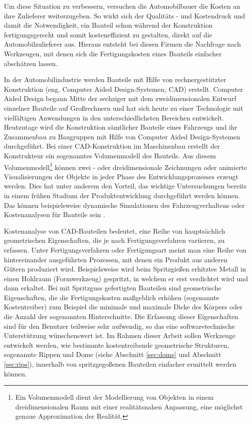 Um diese Situation zu verbessern, versuchen die Automobilbauer die Kosten an ihre Zulieferer weiterzugeben. So wirkt sich der Qualit\"ats - und Kostendruck und damit die Notwendigkeit, ein Bauteil schon w\"ahrend der Konstruktion fertigungsgerecht und somit kosteneffizient zu gestalten, direkt auf die Automobilzulieferer aus. Hieraus entsteht bei diesen Firmen die Nachfrage nach Werkzeugen, mit denen sich die Fertigungskosten eines Bauteils einfacher absch\"atzen lassen. 

In der Automobilindustrie werden Bauteile mit Hilfe von rechnergest\"utzter Konstruktion (eng. Computer Aided Design-Systemen, CAD) erstellt. Computer Aided Design begann Mitte der sechziger mit dem zweidimensionalen Entwurf einzelner Bauteile auf Gro{\ss}rechnern und hat sich heute zu einer Technologie mit vielf\"altigen Anwendungen in den unterschiedlichsten Bereichen entwickelt. Heutzutage wird die Konstruktion s\"amtlicher Bauteile eines Fahrzeugs und ihr Zusammenbau zu Baugruppen mit Hilfe 
von Computer Aided Design-Systemen durchgef\"uhrt. Bei einer CAD-Konstruktion im Maschinenbau erstellt der Konstrukteur ein sogenanntes Volumenmodell des Bauteils. Aus diesem Volumenmodell\footnote{Ein Volumenmodell dient der Modellierung von Objekten in einem dreidimensionalen Raum mit einer realit\"atsnahen Anpassung, eine m\"oglichst genaue Approximation der Realit\"at.} k\"onnen zwei - oder  dreidimensionale Zeichnungen oder animierte Visualisierungen der Objekte in jeder Phase des Entwicklungsprozesses erzeugt werden. Dies hat unter anderem den Vorteil, das wichtige Untersuchungen bereits in einem fr\"uhen Stadium der Produktentwicklung durchgef\"uhrt werden k\"onnen. Das k\"onnen beispielsweise dynamische Simulationen des Fahrzeugverhaltens oder Kostenanalysen f\"ur Bauteile sein \cite{koenig}.

Kostenanalyse von CAD-Bauteilen bedeutet, eine Reihe von haupts\"achlich geometrischen Eigenschaften, die je nach Fertigungsverfahren variieren, zu erfassen. Unter Fertigungsverfahren oder Fertigungsart meint man eine Reihe von hintereinander ausgef\"uhrten Prozessen, mit denen ein Produkt aus anderen G\"utern produziert wird. Beispielsweise wird beim Spritzgie{\ss}en  erhitztes Metall in einen Hohlraum (Formwerkzeug) gespritzt, in welchem er erst verdichtet wird und dann erkaltet. Bei mit Spritzguss gefertigten Bauteilen sind geometrische Eigenschaften, die die Fertigungskosten ma{\ss}geblich erh\"ohen (sogenannte Kostentreiber) zum Beispiel die minimale und maximale Dicke des K\"orpers oder die Anzahl der sogenannten Hinterschnitte. Die Erfassung dieser Eigenschaften sind f\"ur den Benutzer teilweise sehr aufwendig, so das eine softwaretechnische Unterst\"utzung w\"unschenswert ist. Im Rahmen dieser Arbeit sollen Werkzeuge entwickelt werden, wie bestimmte kostentreibende geometrische Strukturen, sogenannte Rippen und Dome (siehe Abschnitt \ref{sec:dome} und Abschnitt \ref{sec:rips}), innerhalb von spritzgego{\ss}enen Bauteilen einfacher ermittelt werden k\"onnen. 

